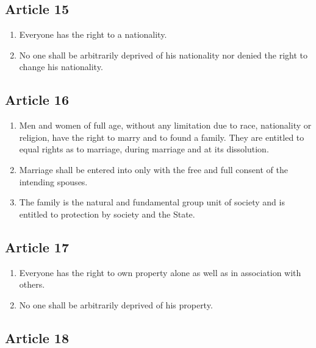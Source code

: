 \documentclass[
  ngerman,
  american,
  titlepage,
  openright,
  DIV=calc,
  toc=listof,
  listof=nochaptergap]{scrbook}
\begin{document}
\subsection{Article 15}\label{article-15}

\begin{enumerate}
\def\labelenumi{\arabic{enumi}.}
\item
  Everyone has the right to a nationality.
\item
  No one shall be arbitrarily deprived of his nationality nor denied the
  right to change his nationality.
\end{enumerate}

\subsection{Article 16}\label{article-16}

\begin{enumerate}
\def\labelenumi{\arabic{enumi}.}
\item
  Men and women of full age, without any limitation due to race,
  nationality or religion, have the right to marry and to found a
  family. They are entitled to equal rights as to marriage, during
  marriage and at its dissolution.
\item
  Marriage shall be entered into only with the free and full consent of
  the intending spouses.
\item
  The family is the natural and fundamental group unit of society and is
  entitled to protection by society and the State.
\end{enumerate}

\subsection{Article 17}\label{article-17}

\begin{enumerate}
\def\labelenumi{\arabic{enumi}.}
\item
  Everyone has the right to own property alone as well as in association
  with others.
\item
  No one shall be arbitrarily deprived of his property.
\end{enumerate}

\subsection{Article 18}\label{article-18}
\end{document}

